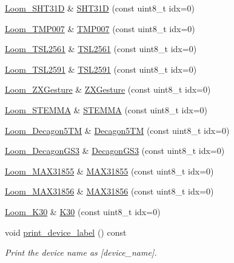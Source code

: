 \begin{DoxyCompactItemize}
\hyperlink{class_loom___s_h_t31_d}{Loom\+\_\+\+S\+H\+T31D} \& \hyperlink{class_loom_manager_a4ddebb2814e2c4b42604b7e0a31d84e8}{S\+H\+T31D} (const uint8\+\_\+t idx=0)
\item 
\hyperlink{class_loom___t_m_p007}{Loom\+\_\+\+T\+M\+P007} \& \hyperlink{class_loom_manager_ae0c9f52e3ec5d968d400e2dd7221c91d}{T\+M\+P007} (const uint8\+\_\+t idx=0)
\item 
\hyperlink{class_loom___t_s_l2561}{Loom\+\_\+\+T\+S\+L2561} \& \hyperlink{class_loom_manager_a4ba1236ae2fb5fad91a7b7e34270ed7c}{T\+S\+L2561} (const uint8\+\_\+t idx=0)
\item 
\hyperlink{class_loom___t_s_l2591}{Loom\+\_\+\+T\+S\+L2591} \& \hyperlink{class_loom_manager_a5fdae347776c8fe96de34a082100d354}{T\+S\+L2591} (const uint8\+\_\+t idx=0)
\item 
\hyperlink{class_loom___z_x_gesture}{Loom\+\_\+\+Z\+X\+Gesture} \& \hyperlink{class_loom_manager_a38313cd58f25f7c3d9766d32bbb5e492}{Z\+X\+Gesture} (const uint8\+\_\+t idx=0)
\item 
\hyperlink{class_loom___s_t_e_m_m_a}{Loom\+\_\+\+S\+T\+E\+M\+MA} \& \hyperlink{class_loom_manager_abb8191fc02e773c230f73e30309bb8c4}{S\+T\+E\+M\+MA} (const uint8\+\_\+t idx=0)
\item 
\hyperlink{class_loom___decagon5_t_m}{Loom\+\_\+\+Decagon5\+TM} \& \hyperlink{class_loom_manager_a7a388fa9da1a6108037116b9d2b7c7af}{Decagon5\+TM} (const uint8\+\_\+t idx=0)
\item 
\hyperlink{class_loom___decagon_g_s3}{Loom\+\_\+\+Decagon\+G\+S3} \& \hyperlink{class_loom_manager_a63e0efbece5fad5b581bef2ee659963a}{Decagon\+G\+S3} (const uint8\+\_\+t idx=0)
\item 
\hyperlink{class_loom___m_a_x31855}{Loom\+\_\+\+M\+A\+X31855} \& \hyperlink{class_loom_manager_a964d0a8bd49d71696b46197daddfb21f}{M\+A\+X31855} (const uint8\+\_\+t idx=0)
\item 
\hyperlink{class_loom___m_a_x31856}{Loom\+\_\+\+M\+A\+X31856} \& \hyperlink{class_loom_manager_a12838292e4ca2af73099938e616c8a35}{M\+A\+X31856} (const uint8\+\_\+t idx=0)
\item 
\hyperlink{class_loom___k30}{Loom\+\_\+\+K30} \& \hyperlink{class_loom_manager_ab6a569394d7c9c423b359885aa400951}{K30} (const uint8\+\_\+t idx=0)
\item 
void \hyperlink{class_loom_manager_a2cbb5e4f1b81ef273b1a07f120cbb06d}{print\+\_\+device\+\_\+label} () const 
\begin{DoxyCompactList}\small\item\em Print the device name as \textquotesingle{}\mbox{[}device\+\_\+name\mbox{]}\textquotesingle{}. \end{DoxyCompactList}\end{DoxyCompactItemize}


